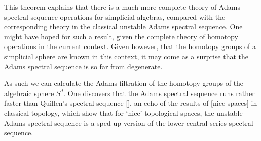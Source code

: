 \documentclass[11pt]{article}
\begin{document}
This theorem explains that there is a much more complete theory of Adams spectral sequence operations for simplicial algebras, compared with the corresponding theory in the classical unstable Adams spectral sequence. One might have hoped for such a result, given the complete theory of homotopy operations in the current context. Given however, that the homotopy groups of a simplicial sphere are known in this context, it may come as a surprise that the Adams spectral sequence is so far from degenerate.

As such we can calculate the Adams filtration of the homotopy groups of the algebraic sphere $S^d$. One discovers that the Adams spectral sequence runs rather faster than Quillen's spectral sequence [], an echo of the results of [nice spaces] in classical topology, which show that for `nice' topological spaces, the unstable Adams spectral sequence is a sped-up version of the lower-central-series spectral sequence.
\end{document}
